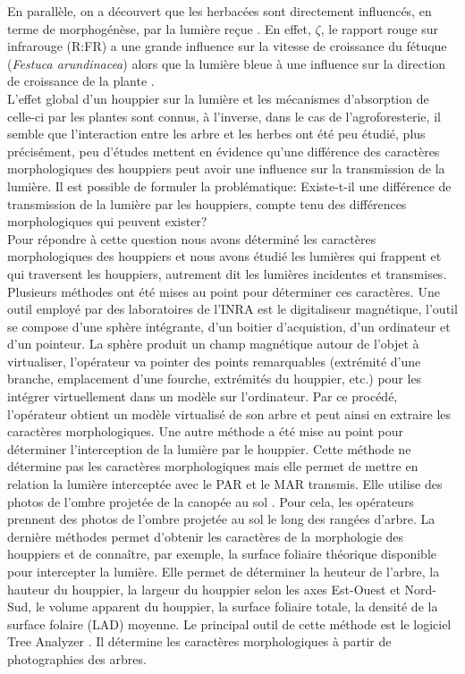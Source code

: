 ﻿\documentclass[12pt]{report}
\begin{document}
En parallèle, on a découvert que les herbacées sont directement influencés, en
terme de morphogénèse, par la lumière reçue \citep{MAR_ref16}. En effet, $\zeta$,
le rapport rouge sur infrarouge (R:FR) a une grande influence sur la vitesse de
croissance du fétuque (\textit{Festuca arundinacea}) alors que la lumière bleue
à une influence sur la direction de croissance de la plante \citep{BioVeg_ref43}.\\

L'effet global d'un houppier sur la lumière et les mécanismes d'absorption de
celle-ci par les plantes sont connus, à l'inverse, dans le cas de
l'agroforesterie, il semble que l'interaction entre les arbre et les herbes ont
été peu étudié, plus précisément, peu d'études mettent en évidence qu'une
différence des caractères morphologiques des houppiers peut avoir une influence sur
la transmission de la lumière. Il est possible de formuler la
problématique: Existe-t-il une différence de transmission de la lumière par les
houppiers, compte tenu des différences morphologiques qui peuvent exister?\\

Pour répondre à cette question nous avons déterminé les caractères
morphologiques des houppiers et nous avons étudié les lumières qui frappent et
qui traversent les houppiers, autrement dit les
lumières incidentes et transmises. Plusieurs méthodes ont été mises au
point pour déterminer ces caractères. Une outil employé par des laboratoires de
l'INRA est le digitaliseur magnétique, l'outil se compose d'une sphère
intégrante, d'un boitier d'acquistion, d'un ordinateur et d'un pointeur. La
sphère produit un champ magnétique autour de l'objet à virtualiser, l'opérateur
va pointer des points remarquables (extrémité d'une branche, emplacement d'une
fourche, extrémités du houppier, etc.) pour les intégrer virtuellement dans un
modèle sur l'ordinateur. Par ce procédé, l'opérateur obtient un modèle
virtualisé de son arbre et peut ainsi en extraire les caractères morphologiques.
Une autre méthode a été mise au point pour déterminer l'interception de la lumière par
le houppier. Cette méthode ne détermine pas les caractères
morphologiques mais elle permet de mettre en relation la lumière interceptée avec
le PAR et le MAR transmis. Elle utilise des photos de l'ombre projetée de la canopée au
sol \citep{MAR_ref32}. Pour cela, les opérateurs prennent des photos de l'ombre
projetée au sol le long des rangées d'arbre. La dernière méthodes permet
d'obtenir les caractères de la morphologie des houppiers et de connaître, par
exemple, la surface foliaire théorique disponible pour intercepter la lumière.
Elle permet de déterminer la heuteur de l'arbre, la hauteur du houppier, la
largeur du houppier selon les axes Est-Ouest et Nord-Sud, le volume apparent du
houppier, la surface foliaire totale, la densité de la surface folaire (LAD)
moyenne. Le principal outil de cette méthode est le logiciel Tree Analyzer
\citep{MAR_ref24,MAR_ref25}. Il détermine les caractères morphologiques à
partir de photographies des arbres.
\end{document}
